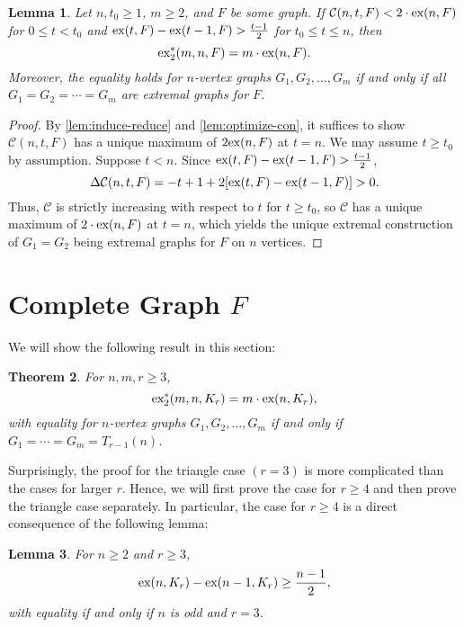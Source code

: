 \documentclass[10pt, reqno]{report}
\newtheorem{theorem}{Theorem}[chapter]
\newtheorem{lemma}[theorem]{Lemma}
\newcommand*{\ex}{\textnormal{ex}}
\newcommand*{\dex}{\textnormal{ex}_2}
\newcommand*{\con}{\mathcal{C}}
\begin{document}
\begin{lemma}\label{lem:induce-cond}
  Let $n, t_0 \geq 1$, $m \geq 2$, and $F$ be some graph. If $\con(n, t, F)< 2 \cdot \ex(n, F)$ for $0 \leq t < t_0$ and $\ex(t, F) - \ex(t - 1, F) > \frac{t - 1}{2}$ for $t_0 \leq t \leq n$, then
  \[
    \dex^*(m, n, F) = m \cdot \ex(n, F).
  \]
  Moreover, the equality holds for $n$-vertex graphs $G_1, G_2, \ldots, G_m$ if and only if all $G_1 = G_2 = \cdots = G_m$ are extremal graphs for $F$.
\end{lemma}


\begin{proof}
  By \cref{lem:induce-reduce} and \cref{lem:optimize-con}, it suffices to show $\con(n, t, F)$ has a unique maximum of $2\ex(n, F)$ at $t = n$. We may assume $t \geq t_0$ by assumption. Suppose $t < n$. Since $\ex(t, F) - \ex(t - 1, F) > \frac{t - 1}{2}$,
  \[
    \Delta \con(n, t, F) = - t + 1 + 2[\ex(t, F) - \ex(t - 1, F)] > 0.
  \]
  Thus, $\con$ is strictly increasing with respect to $t$ for $t \geq t_0$, so $\con$ has a unique maximum of $2 \cdot \ex(n, F)$ at $t = n$, which yields the unique extremal construction of $G_1 = G_2$ being extremal graphs for $F$ on $n$ vertices.
\end{proof}

\section{Complete Graph $F$}

We will show the following result in this section:

\begin{theorem}\label{thm:induce-complete}
  For $n, m, r \geq 3$, 
  \[
    \dex^*(m, n, K_{r}) = m \cdot \ex(n, K_{r}),
  \]
  with equality for $n$-vertex graphs $G_1, G_2, \ldots, G_m$ if and only if $G_1 = \cdots = G_m = T_{r - 1}(n)$.
\end{theorem}

Surprisingly, the proof for the triangle case $(r = 3)$ is more complicated than the cases for larger $r$. Hence, we will first prove the case for $r \geq 4$ and then prove the triangle case separately. In particular, the case for $r \geq 4$ is a direct consequence of the following lemma:

\begin{lemma}\label{lem:induce-complete-cond}
  For $n \geq 2$ and $r \geq 3$,
  \[
    \ex(n, K_{r}) - \ex(n - 1, K_{r}) \geq \frac{n - 1}{2},
  \]
  with equality if and only if $n$ is odd and $r = 3$.
\end{lemma}
\end{document}
